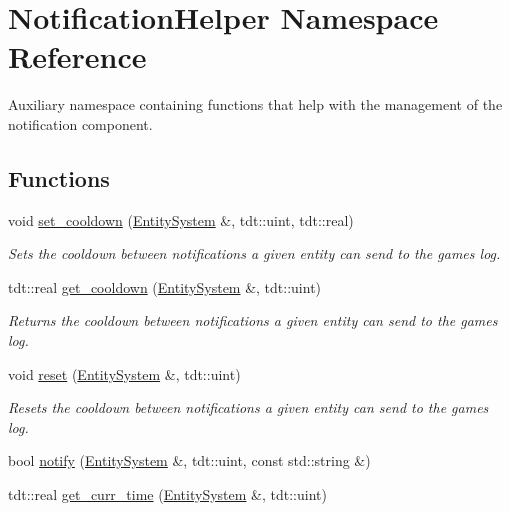 \hypertarget{namespace_notification_helper}{}\section{Notification\+Helper Namespace Reference}
\label{namespace_notification_helper}


Auxiliary namespace containing functions that help with the management of the notification component.  


\subsection*{Functions}
\begin{DoxyCompactItemize}
\item 
void \hyperlink{namespace_notification_helper_aa19e2a514d5718da6dac2956924299c9}{set\+\_\+cooldown} (\hyperlink{class_entity_system}{Entity\+System} \&, tdt\+::uint, tdt\+::real)
\begin{DoxyCompactList}\small\item\em Sets the cooldown between notifications a given entity can send to the game\textquotesingle{}s log. \end{DoxyCompactList}\item 
tdt\+::real \hyperlink{namespace_notification_helper_a203287d646e7b8109623a1527749602d}{get\+\_\+cooldown} (\hyperlink{class_entity_system}{Entity\+System} \&, tdt\+::uint)
\begin{DoxyCompactList}\small\item\em Returns the cooldown between notifications a given entity can send to the game\textquotesingle{}s log. \end{DoxyCompactList}\item 
void \hyperlink{namespace_notification_helper_aab9d2fbf98ec283ebf7572eeb54798d8}{reset} (\hyperlink{class_entity_system}{Entity\+System} \&, tdt\+::uint)
\begin{DoxyCompactList}\small\item\em Resets the cooldown between notifications a given entity can send to the game\textquotesingle{}s log. \end{DoxyCompactList}\item 
bool \hyperlink{namespace_notification_helper_a8441ed31d131217272b3d4f883313361}{notify} (\hyperlink{class_entity_system}{Entity\+System} \&, tdt\+::uint, const std\+::string \&)
\item 
tdt\+::real \hyperlink{namespace_notification_helper_a401b70689884edf0efe61b1a7c932e47}{get\+\_\+curr\+\_\+time} (\hyperlink{class_entity_system}{Entity\+System} \&, tdt\+::uint)

\end{DoxyCompactItemize}
